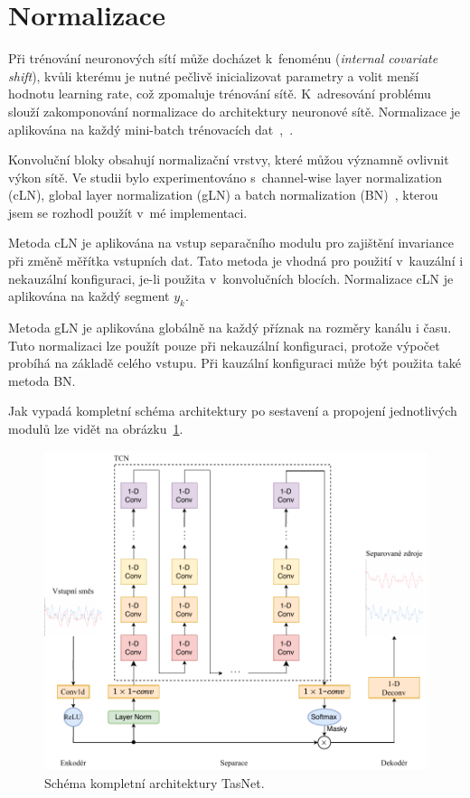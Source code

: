 \section{Normalizace}
Při trénování neuronových sítí může docházet k~fenoménu  (\textit{internal covariate shift}), kvůli kterému je nutné pečlivě inicializovat parametry a volit menší hodnotu learning rate, což zpomaluje trénování sítě. K~adresování problému slouží zakomponování normalizace do architektury neuronové sítě. Normalizace je aplikována na každý mini-batch trénovacích dat~\cite{ioffe2015batch},~\cite{ba2016layer}.

Konvoluční bloky obsahují normalizační vrstvy, které můžou významně ovlivnit výkon sítě. Ve studii bylo experimentováno s~channel-wise layer normalization (cLN), global layer normalization (gLN) a batch normalization (BN)~\cite{ioffe2015batch}, kterou jsem se rozhodl použít v~mé implementaci.

Metoda cLN je aplikována na vstup separačního modulu pro zajištění invariance při změně měřítka vstupních dat. Tato metoda je vhodná pro použití v~kauzální i nekauzální konfiguraci, je-li použita v~konvolučních blocích. Normalizace cLN je aplikována na každý segment $y_k$. 

Metoda gLN je aplikována globálně na každý příznak na rozměry kanálu i času. Tuto normalizaci lze použít pouze při nekauzální konfiguraci, protože výpočet probíhá na základě celého vstupu.
Při kauzální konfiguraci může být použita také metoda BN.

\bigskip

Jak vypadá kompletní schéma architektury po sestavení a propojení jednotlivých modulů lze vidět na obrázku~\ref{fig:tasnet-modul}. 

\begin{figure}[H]
    \centering
    \includegraphics[scale=1.0]{obrazky-figures/tasnet-architecture.pdf}
    \caption{\label{fig:tasnet-modul}Schéma kompletní architektury TasNet.}
\end{figure}


